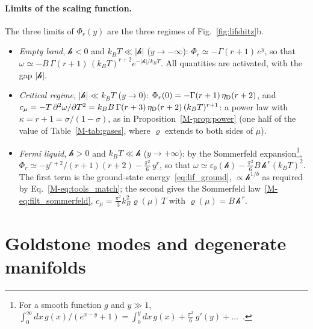 \documentclass[10pt,a4paper]{article}
\theoremstyle{plain}
\theoremstyle{remark}
\newcommand{\hfield}{\mathscr{h}}  %
\newcommand{\etaD}{\eta_{\rm D}}  %
\begin{document}
\paragraph{Limits of the scaling function.} The three limits of $\Phi_r(y)$
are the three regimes of Fig.~\ref{fig:lifshitz}b.
\begin{itemize}\setlength{\itemsep}{0pt}
\item \emph{Empty band}, $\hfield<0$ and $k_BT\ll|\hfield|$ ($y\to-\infty$):
  $\Phi_r\simeq-\Gamma(r+1)\,e^{y}$, so that
  $\omega\simeq-B\,\Gamma(r+1)\,(k_BT)^{r+2}e^{-|\hfield|/k_BT}$. All
  quantities are activated, with the gap $|\hfield|$.
\item \emph{Critical regime}, $|\hfield|\ll k_BT$ ($y\to0$):
  $\Phi_r(0)=-\Gamma(r+1)\,\etaD(r+2)$, and
  $c_\mu=-T\,\partial^{2}\omega/\partial T^{2}
  =k_BB\,\Gamma(r+3)\,\etaD(r+2)\,(k_BT)^{r+1}$: a power law with
  $\kappa=r+1=\sigma/(1-\sigma)$, as in Proposition~\ref{M-prop:power} (one
  half of the value of Table~\ref{M-tab:gases}, where $\varrho$ extends to
  both sides of $\mu$).
\item \emph{Fermi liquid}, $\hfield>0$ and $k_BT\ll\hfield$ ($y\to+\infty$):
  by the Sommerfeld expansion\footnote{For a smooth function $g$ and
  $y\gg1$,
  $\int_0^{\infty}dx\,g(x)/(e^{x-y}+1)=\int_0^{y}dx\,g(x)+\tfrac{\pi^{2}}{6}\,g'(y)+\dots$~\cite[Sec.~4.3]{Schwabl}.},
  $\Phi_r\simeq-y^{r+2}/(r+1)(r+2)-\tfrac{\pi^{2}}{6}\,y^{r}$, so that
  $\omega\simeq\varepsilon_0(\hfield)-\tfrac{\pi^{2}}{6}B\,\hfield^{\,r}(k_BT)^{2}$.
  The first term is the ground-state energy~\eqref{eq:lif_ground},
  $\propto\hfield^{1/b}$ as required by Eq.~\eqref{M-eq:tools_match}; the
  second gives the Sommerfeld law~\eqref{M-eq:filt_sommerfeld},
  $c_\mu=\tfrac{\pi^{2}}{3}k_B^{2}\varrho(\mu)\,T$ with
  $\varrho(\mu)=B\,\hfield^{\,r}$.
\end{itemize}

\section{Goldstone modes and degenerate manifolds}
\label{sec:goldstone}
\end{document}
